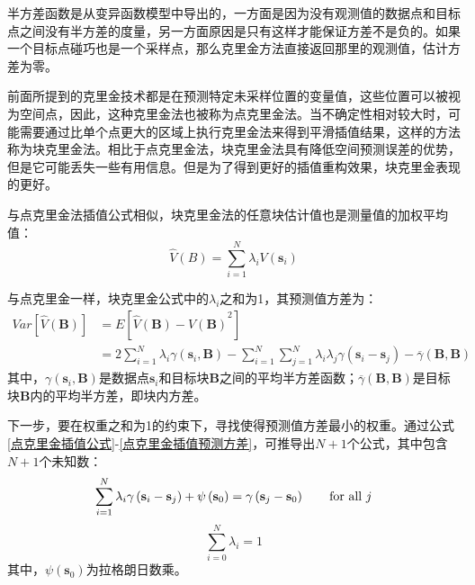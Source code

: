 半方差函数是从变异函数模型中导出的，一方面是因为没有观测值的数据点和目标点之间没有半方差的度量，另一方面原因是只有这样才能保证方差不是负的。如果一个目标点碰巧也是一个采样点，那么克里金方法直接返回那里的观测值，估计方差为零。

前面所提到的克里金技术都是在预测特定未采样位置的变量值，这些位置可以被视为空间点，因此，这种克里金法也被称为点克里金法。当不确定性相对较大时，可能需要通过比单个点更大的区域上执行克里金法来得到平滑插值结果，这样的方法称为块克里金法。相比于点克里金法，块克里金法具有降低空间预测误差的优势，但是它可能丢失一些有用信息。但是为了得到更好的插值重构效果，块克里金表现的更好。

与点克里金法插值公式相似，块克里金法的任意块估计值也是测量值的加权平均值：
\begin{equation}
    \hat{V}\left( B \right) = \sum_{i=1}^{N} \lambda_{i} V \left( \mathbf{s}_{i} \right)
    \label{块克里金插值公式}
\end{equation}

与点克里金一样，块克里金公式中的$ \lambda_{i} $之和为1，其预测值方差为：
\begin{equation}
    \begin{split}
        Var\left[ \hat{V} \left( \mathbf{B} \right) \right]
        & = E\left[ {\hat{V}\left( \mathbf{B} \right) - V\left( \mathbf{B} \right)}^{2} \right]     \\
        & = 2 \sum_{i=1}^{N} \lambda_{i} \gamma\left( \mathbf{s}_{i} , \mathbf{B} \right) - \sum_{i=1}^{N} \sum_{j=1}^{N} \lambda_{i} \lambda_{j} \gamma\left( \mathbf{s}_{i} - \mathbf{s}_{j} \right) - \overline{\gamma} \left( \mathbf{B}, \mathbf{B} \right)
    \end{split}
    \label{块克里金插值预测方差}
\end{equation}
其中，$ \gamma\left( \mathbf{s}_{i} , \mathbf{B} \right) $是数据点$ \mathbf{s}_{i} $和目标块$ \mathbf{B} $之间的平均半方差函数；$ \overline{\gamma} \left( \mathbf{B}, \mathbf{B} \right) $是目标块$ \mathbf{B} $内的平均半方差，即块内方差。

下一步，要在权重之和为1的约束下，寻找使得预测值方差最小的权重。通过公式\ref{点克里金插值公式}-\ref{点克里金插值预测方差}，可推导出$ N+1 $个公式，其中包含$ N+1 $个未知数：
\begin{equation}
    \sum_{i=1}^{N} \lambda_{i} \gamma \left( \mathbf{s}_{i} - \mathbf{s}_{j} \right) + \psi \left( \mathbf{s}_{0} \right) = \gamma \left( \mathbf{s}_{j} - \mathbf{s}_{0} \right) \qquad \text{for all $ j $}
    \label{点克里金法N个方程}
\end{equation}
\begin{equation}
    \sum_{i=0}^{N}\lambda_{i} = 1
    \label{点克里金法N+1个方程}
\end{equation}
其中，$ \psi \left( \mathbf{s}_{0} \right) $为拉格朗日数乘。

